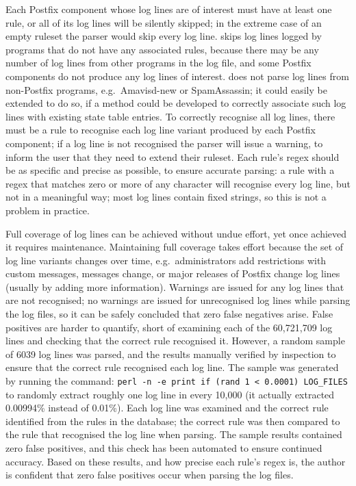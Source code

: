 Each Postfix component whose log lines are of interest must have at least
one rule, or all of its log lines will be silently skipped; in the extreme
case of an empty ruleset the parser would skip every log line.
\parsername{} skips log lines logged by programs that do not have any
associated rules, because there may be any number of log lines from other
programs in the log file, and some Postfix components do not produce any
log lines of interest.  \parsername{} does not parse log lines from
non-Postfix programs, e.g.\ Amavisd-new or SpamAssassin; it could easily be
extended to do so, if a method could be developed to correctly associate
such log lines with existing state table entries.  To correctly recognise
all log lines, there must be a rule to recognise each log line variant
produced by each Postfix component; if a log line is not recognised the
parser will issue a warning, to inform the user that they need to extend
their ruleset.  Each rule's regex should be as specific and precise as
possible, to ensure accurate parsing: a rule with a regex that matches zero
or more of any character will recognise every log line, but not in a
meaningful way; most log lines contain fixed strings, so this is not a
problem in practice.

Full coverage of log lines can be achieved without undue effort, yet once
achieved it requires maintenance.  Maintaining full coverage takes effort because
the set of log line variants changes over time, e.g.\ administrators add
restrictions with custom messages,  messages change, or
major releases of Postfix change log lines (usually by adding more
information).  Warnings are issued for any log lines that are not
recognised; no warnings are issued for unrecognised log lines while parsing
the \numberOFlogFILES{} log files, so it can be safely concluded that zero
false negatives arise.  False positives are harder to quantify, short of
examining each of the 60,721,709 log lines and checking that the correct
rule recognised it.  However, a random sample of 6039 log lines was parsed,
and the results manually verified by inspection to ensure that the correct
rule recognised each log line.  The sample was generated by running the
command: \texttt{perl -n -e \singlequote{}print if (rand 1 <
0.0001)\singlequote{} LOG\_FILES} to randomly extract roughly one log line
in every 10,000 (it actually extracted 0.00994\% instead of 0.01\%).  Each
log line was examined and the correct rule identified from the
\numberOFrules{} rules in the database; the correct rule was then compared
to the rule that recognised the log line when parsing.  The sample results
contained zero false positives, and this check has been automated to ensure
continued accuracy.  Based on these results, and how precise each rule's
regex is, the author is confident that zero false positives occur when
parsing the \numberOFlogFILES{} log files.

